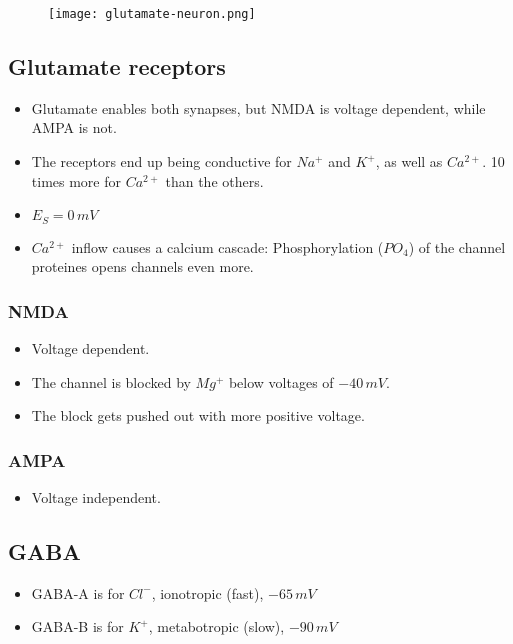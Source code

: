 \documentclass[main]{subfiles}
\begin{document}
\begin{figure}[H]
	\centering
 	\texttt{[image: glutamate-neuron.png]}
\end{figure} 

\subsection{Glutamate receptors}
\begin{itemize}[noitemsep,nolistsep]
	\item Glutamate enables both synapses, but NMDA is voltage dependent, while AMPA is not.
	\item The receptors end up being conductive for $Na^+$ and $K^+$, as well as $Ca^{2+}$. 10 times more for $Ca^{2+}$ than the others.
	\item $E_S = 0\,mV$
	\item $Ca^{2+}$ inflow causes a calcium cascade: Phosphorylation ($PO_4$) of the channel proteines opens channels even more.
\end{itemize}

\subsubsection{NMDA}
\begin{itemize}[noitemsep,nolistsep]
	\item Voltage dependent.
	\item The channel is blocked by $Mg^+$ below voltages of $-40\,mV$.
	\item The block gets pushed out with more positive voltage.
\end{itemize}

\subsubsection{AMPA}
\begin{itemize}[noitemsep,nolistsep]
	\item Voltage independent.
\end{itemize}

\subsection{GABA}
\begin{itemize}[noitemsep,nolistsep]
	\item GABA-A is for $Cl^-$, ionotropic (fast), $-65\,mV$
	\item GABA-B is for $K^+$, metabotropic (slow), $-90\,mV$
\end{itemize}
\end{document}
